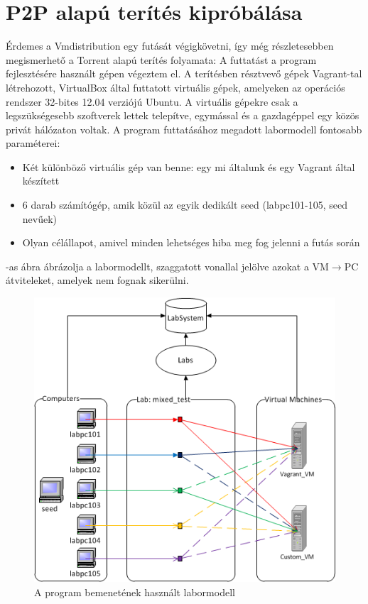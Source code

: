\section{P2P alapú terítés kipróbálása}

Érdemes a Vmdistribution egy futását végigkövetni, így még részletesebben megismerhető a Torrent alapú terítés folyamata:
A futtatást a program fejlesztésére használt gépen végeztem el. A terítésben résztvevő gépek Vagrant-tal létrehozott, VirtualBox által futtatott virtuális gépek, amelyeken az operációs rendszer 32-bites 12.04 verziójú Ubuntu. A virtuális gépekre csak a legszükségesebb szoftverek lettek telepítve, egymással és a gazdagéppel egy közös privát hálózaton voltak. A program futtatásához megadott labormodell fontosabb paraméterei:

\begin{itemize}
  \item Két különböző virtuális gép van benne: egy mi általunk és egy Vagrant által készített
  \item 6 darab számítógép, amik közül az egyik dedikált seed (labpc101-105, seed nevűek)
  \item Olyan célállapot, amivel minden lehetséges hiba meg fog jelenni a futás során
\end{itemize}

-as ábra ábrázolja a labormodellt, szaggatott vonallal jelölve azokat a VM$\rightarrow$PC átviteleket, amelyek nem fognak sikerülni.

\begin{figure}[h]
\centering
\includegraphics[width=130mm, keepaspectratio]{figures/testmodel.png}
\caption{A program bemenetének használt labormodell}
\label{fig:testmodel}
\end{figure}

